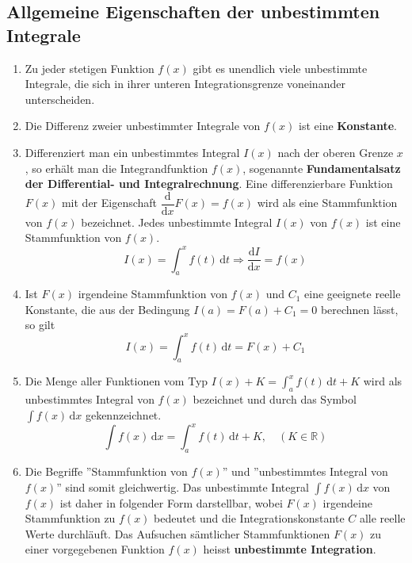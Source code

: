 \subsection{Allgemeine Eigenschaften der unbestimmten Integrale}
\begin{enumerate}[$(a)$]
\item Zu jeder stetigen Funktion $f\left(x\right)$ gibt es unendlich viele unbestimmte Integrale, die sich in ihrer unteren Integrationsgrenze voneinander unterscheiden.
\item Die Differenz zweier unbestimmter Integrale von $f\left(x\right)$ ist eine \textbf{Konstante}.
\item Differenziert man ein unbestimmtes Integral $I\left(x\right)$ nach der oberen Grenze $x$, so erhält man die Integrandfunktion $f\left(x\right)$, sogenannte \textbf{Fundamentalsatz der Differential- und Integralrechnung}.
\newline\newline
Eine differenzierbare Funktion $F\left(x\right)$ mit der Eigenschaft $\dfrac{\text{d}}{\text{d}x}F\left(x\right)=f\left(x\right)$ wird als eine Stammfunktion von $f\left(x\right)$ bezeichnet. Jedes unbestimmte Integral $I\left(x\right)$ von $f\left(x\right)$ ist eine Stammfunktion von $f\left(x\right)$.
\begin{equation}
\boxed{I\left(x\right)=\displaystyle \int_a^xf\left(t\right)\,\text{d}t\Longrightarrow \dfrac{\text{d}I}{\text{d}x}=f\left(x\right)}
\end{equation}
\item Ist $F\left(x\right)$ irgendeine Stammfunktion von $f\left(x\right)$ und $C_1$ eine geeignete reelle Konstante, die aus der Bedingung $I\left(a\right)=F\left(a\right)+C_1=0$ berechnen lässt, so gilt
\begin{equation}
\boxed{I\left(x\right)=\displaystyle \int_a^xf\left(t\right)\,\text{d}t=F\left(x\right)+C_1}
\end{equation}
\item Die Menge aller Funktionen vom Typ $I\left(x\right)+K=\displaystyle \int_a^xf\left(t\right)\,\text{d}t+K$ wird als unbestimmtes Integral von $f\left(x\right)$ bezeichnet und durch das Symbol $\displaystyle \int f\left(x\right)\,\text{d}x$ gekennzeichnet.
\begin{equation}
\boxed{\displaystyle \int f\left(x\right)\,\text{d}x=\displaystyle \int_a^xf\left(t\right)\,\text{d}t+K,\quad \left(K\in \mathbb{R}\right)}
\end{equation}
\item Die Begriffe ''Stammfunktion von $f\left(x\right)$'' und ''unbestimmtes Integral von $f\left(x\right)$'' sind somit gleichwertig. Das unbestimmte Integral $\displaystyle \int f\left(x\right)\,\text{d}x$ von $f\left(x\right)$ ist daher in folgender Form darstellbar, wobei $F\left(x\right)$ irgendeine Stammfunktion zu $f\left(x\right)$ bedeutet und die Integrationskonstante $C$ alle reelle Werte durchläuft. Das Aufsuchen sämtlicher Stammfunktionen $F\left(x\right)$ zu einer vorgegebenen Funktion $f\left(x\right)$ heisst \textbf{unbestimmte Integration}.

\end{enumerate}
